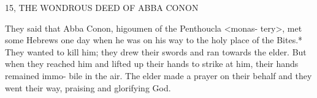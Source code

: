 15, THE WONDROUS DEED OF ABBA CONON

They said that Abba Conon, higoumen of the Penthoucla <monas-
tery>, met some Hebrews one day when he was on his way to the
holy place of the Bites.* They wanted to kill him; they drew their
swords and ran towards the elder. But when they reached him and
lifted up their hands to strike at him, their hands remained immo-
bile in the air. The elder made a prayer on their behalf and they
went their way, praising and glorifying God.
